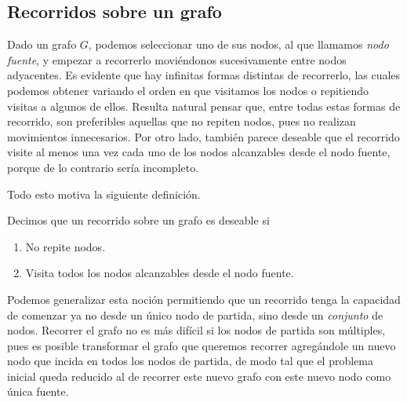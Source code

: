 \subsection{Recorridos sobre un grafo}
Dado un grafo $G$, podemos seleccionar uno de sus nodos, al que llamamos \textit{nodo fuente}, y empezar a recorrerlo moviéndonos sucesivamente entre nodos adyacentes. Es evidente que hay infinitas formas distintas de recorrerlo, las cuales podemos obtener variando el orden en que visitamos los nodos o repitiendo visitas a algunos de ellos. Resulta natural pensar que, entre todas estas formas de recorrido, son preferibles aquellas que no repiten nodos, pues no realizan movimientos innecesarios. Por otro lado, también parece deseable que el recorrido visite al menos una vez cada uno de los nodos alcanzables desde el nodo fuente, porque de lo contrario sería incompleto.

Todo esto motiva la siguiente definición.

\begin{defi}
Decimos que un recorrido sobre un grafo es deseable si
\begin{enumerate}
	\item No repite nodos.
	\item Visita todos los nodos alcanzables desde el nodo fuente.
\end{enumerate}
\end{defi}

Podemos generalizar esta noción permitiendo que un recorrido tenga la capacidad de comenzar ya no desde un único nodo de partida, sino desde un \emph{conjunto} de nodos. Recorrer el grafo no es más difícil si los nodos de partida son múltiples, pues es posible transformar el grafo que queremos recorrer agregándole un nuevo nodo que incida en todos los nodos de partida, de modo tal que el problema inicial queda reducido al de recorrer este nuevo grafo con este nuevo nodo como única fuente.


